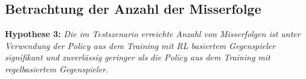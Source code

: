 \subsection{Betrachtung der Anzahl der Misserfolge}

\textbf{Hypothese 3:}
\textit{Die im Testszenario erreichte Anzahl von Misserfolgen ist unter Verwendung der Policy aus dem Training mit RL basiertem Gegenspieler signifikant und zuverlässig geringer als die Policy aus dem Training mit regelbasiertem Gegenspieler.}
